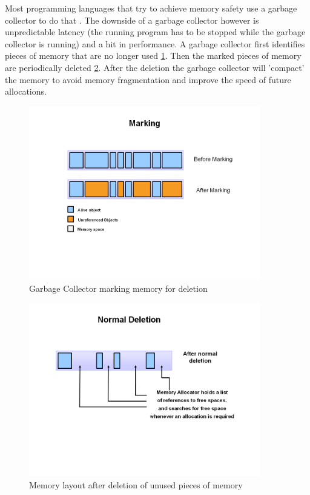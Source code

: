 Most programming languages that try to achieve memory safety use a garbage collector to do that \cite{java_garbage_collector}.
The downside of a garbage collector however is unpredictable latency (the running program has to be stopped while the garbage collector is running) and a hit in performance.
A garbage collector first identifies pieces of memory that are no longer used \ref{fig:gc_mark}.
Then the marked pieces of memory are periodically deleted \ref{fig:gc_delete}.
After the deletion the garbage collector will 'compact' the memory to avoid memory fragmentation and improve the speed of future allocations.

\begin{figure}[htb]
    \centering
    \includegraphics[width=0.9\textwidth]{figures/fundamentals_garbage_collector_marking.PNG}
    \caption[Illustration: Garbage Collector marking memory for deletion \cite{java_garbage_collector}]{Garbage Collector marking memory for deletion}
    \label{fig:gc_mark}
\end{figure}

\begin{figure}[htb]
    \centering
    \includegraphics[width=0.9\textwidth]{figures/fundamentals_garbage_collector_deletion.PNG}
    \caption[Illustration: Garbage Collector deleting marked memory \cite{java_garbage_collector}]{Memory layout after deletion of unused pieces of memory}
    \label{fig:gc_delete}
\end{figure}

